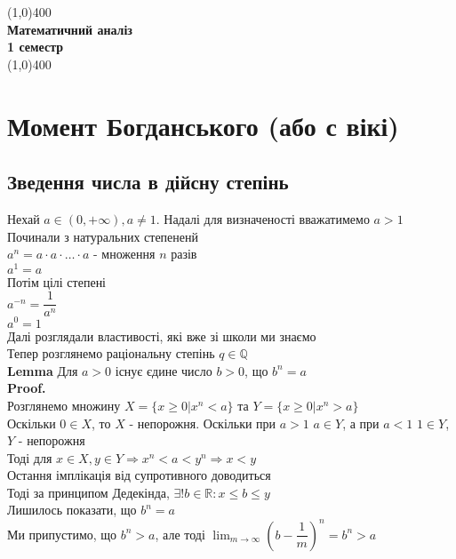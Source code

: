 \documentclass[a4paper, 14pt]{extarticle}
\def\huge{\displaystyle}
\def\bigline{\vspace{5mm}\\}
\def\lm#1{\textbf{Lemma {#1}}}
\def\proof{\textbf{Proof.}\\}
\def\bigline{\vspace{5mm}\\}
\begin{document}
	\begin{titlepage}
		\begin{center}
		\hfill
		\vfill
		\line(1,0){400}\\
		\large{\textbf{Математичний аналіз}}\\[1mm]
		{\textbf{1 семестр}}\\[1mm]
		\line(1,0){400}\\
		\vfill
        	\end{center}
    	\end{titlepage}
\tableofcontents
\newpage

\section*{Момент Богданського (або с вікі)}
\subsection*{Зведення числа в дійсну степінь}
Нехай $a \in (0,+\infty), a \neq 1$. Надалі для визначеності вважатимемо $a > 1$\\
Починали з натуральних степененй\\
$a^n = a \cdot a \cdot \dots \cdot a$ - множення $n$ разів\\
$a^1 = a$\\
Потім цілі степені\\
$a^{-n} = \dfrac{1}{a^n}$\\
$a^0 = 1$\\
Далі розглядали властивості, які вже зі школи ми знаємо\\
Тепер розглянемо раціональну степінь $q \in \mathbb{Q}$
\bigline
\lm{} Для $a > 0$ існує єдине число $b > 0$, що $b^n = a$\\
\proof
Розглянемо множину $X = \{x \geq 0 | x^n < a\}$ та $Y = \{x \geq 0 | x^n > a\}$\\
Оскільки $0 \in X$, то $X$ - непорожня. Оскільки при $a>1$ $a \in Y$, а при $a < 1$ $1 \in Y$, $Y$ - непорожня\\
Тоді для $x \in X, y \in Y \Rightarrow x^n < a < y^n \Rightarrow x < y$\\
Остання імплікація від супротивного доводиться\\
Тоді за принципом Дедекінда, $\exists ! b \in \mathbb{R}: x \leq b \leq y$\\
Лишилось показати, що $b^n = a$\\
Ми припустимо, що $b^n > a$, але тоді $\huge \lim_{m \to \infty} \left(b - \dfrac{1}{m} \right)^n = b^n > a$\\
\end{document}
